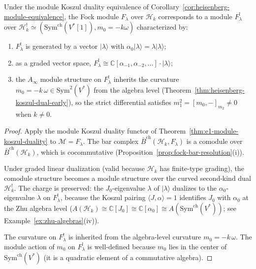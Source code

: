 \begin{proposition}
\label{prop:fock-koszul-dual}
Under the module Koszul duality equivalence of
Corollary~\textup{\ref{cor:heisenberg-module-equivalence}}, the Fock module
$F_\lambda$ over $\mathcal{H}_k$ corresponds to a module
$F_\lambda^!$ over
$\mathcal{H}_k^!
\simeq(\mathrm{Sym}^{\mathrm{ch}}(V^*[1]),m_0=-k\omega)$
characterized by:
\begin{enumerate}[label=\textup{(\roman*)}]
\item $F_\lambda^!$ is generated by a vector $|\lambda\rangle$ with
 $\alpha_0|\lambda\rangle = \lambda|\lambda\rangle$;
\item as a graded vector space,
 $F_\lambda^! \cong \mathbb{C}[\alpha_{-1}, \alpha_{-2}, \ldots]
 \cdot |\lambda\rangle$;
\item the $A_\infty$ module structure on $F_\lambda^!$ inherits the
 curvature $m_0 = -k\,\omega \in \mathrm{Sym}^2(V^*)$
 from the algebra level
 \textup{(}Theorem~\textup{\ref{thm:heisenberg-koszul-dual-early})},
 so the strict differential satisfies
 $m_1^2 = [m_0, -]_{m_2} \neq 0$ when $k \neq 0$.
\end{enumerate}
\end{proposition}

\begin{proof}
Apply the module Koszul duality functor of
Theorem~\ref{thm:e1-module-koszul-duality} to
$\mathcal{M} = F_\lambda$. The bar complex
$\bar{B}^{\mathrm{ch}}(\mathcal{H}_k, F_\lambda)$ is a comodule
over $\bar{B}^{\mathrm{ch}}(\mathcal{H}_k)$, which is
cocommutative (Proposition~\ref{prop:fock-bar-resolution}(i)).

Under graded linear dualization (valid because $\mathcal{H}_k$
has finite-type grading), the comodule structure becomes a module
structure over the curved second-kind dual $\mathcal{H}_k^!$.
The charge is preserved: the $J_0$-eigenvalue $\lambda$ of
$|\lambda\rangle$ dualizes to the $\alpha_0$-eigenvalue $\lambda$ on
$F_\lambda^!$, because the Koszul pairing $\langle J, \alpha \rangle = 1$
identifies $J_0$ with $\alpha_0$ at the Zhu algebra level
($A(\mathcal{H}_k) \cong \mathbb{C}[J_0]
\cong \mathbb{C}[\alpha_0] \cong
A(\mathrm{Sym}^{\mathrm{ch}}(V^*))$; see
Example~\ref{ex:zhu-algebras}(iv)).

The curvature on $F_\lambda^!$ is inherited from the algebra-level
curvature $m_0 = -k\,\omega$. The module action of $m_0$
on $F_\lambda^!$ is well-defined because $m_0$ lies in the center of
$\mathrm{Sym}^{\mathrm{ch}}(V^*)$ (it is a quadratic element of a
commutative algebra).
\end{proof}

